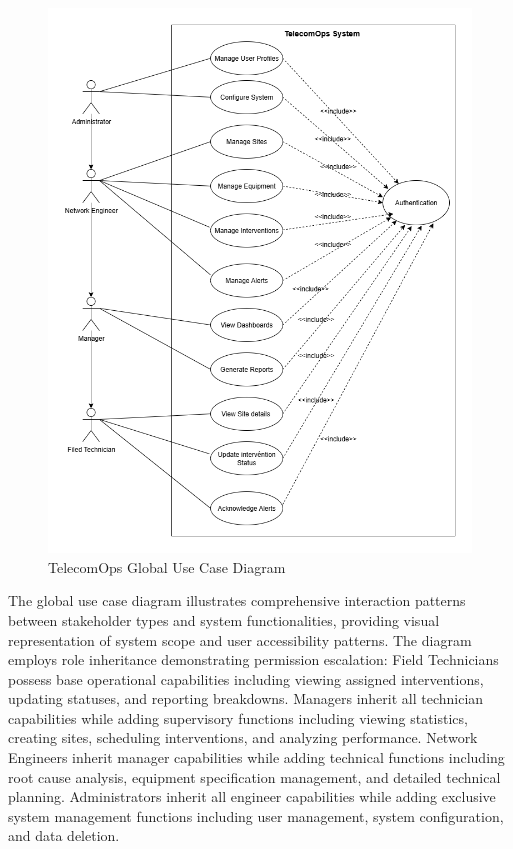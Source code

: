 \begin{figure}[H]
    \centering
    \includegraphics[width=0.95\linewidth]{img/chap_02/TelecomOps_UseCase_Diagram.png}
    \caption{TelecomOps Global Use Case Diagram}
    \label{fig:use_case_global}
\end{figure}

The global use case diagram illustrates comprehensive interaction patterns between stakeholder types and system functionalities, providing visual representation of system scope and user accessibility patterns. The diagram employs role inheritance demonstrating permission escalation: Field Technicians possess base operational capabilities including viewing assigned interventions, updating statuses, and reporting breakdowns. Managers inherit all technician capabilities while adding supervisory functions including viewing statistics, creating sites, scheduling interventions, and analyzing performance. Network Engineers inherit manager capabilities while adding technical functions including root cause analysis, equipment specification management, and detailed technical planning. Administrators inherit all engineer capabilities while adding exclusive system management functions including user management, system configuration, and data deletion.

